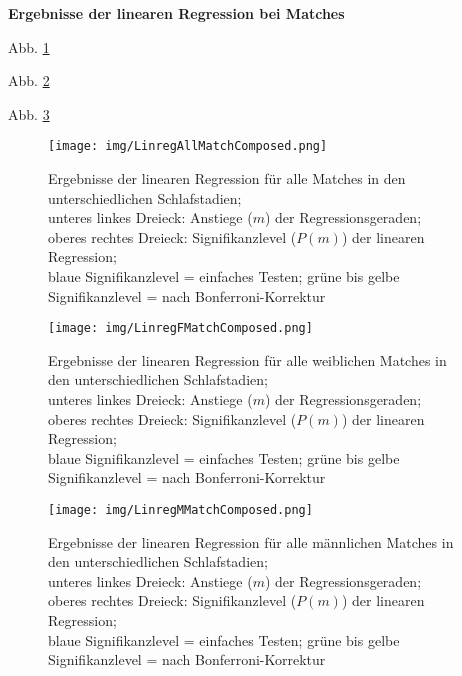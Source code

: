 \textbf{Ergebnisse der linearen Regression bei Matches}

Abb. \ref{fig:LinregAllMatchComposed}

Abb. \ref{fig:LinregFMatchComposed}

Abb. \ref{fig:LinregMMatchComposed}




\begin{figure}[H]
	\centering
	\texttt{[image: img/LinregAllMatchComposed.png]}
	\caption[Ergebnisse der linearen Regression für alle Matches]{Ergebnisse der linearen Regression für alle Matches in den unterschiedlichen Schlafstadien;\\unteres linkes Dreieck: Anstiege ($m$) der Regressionsgeraden;\\oberes rechtes Dreieck: Signifikanzlevel ($P(m)$) der linearen Regression;\\blaue Signifikanzlevel = einfaches Testen; grüne bis gelbe Signifikanzlevel = nach Bonferroni-Korrektur}
	\label{fig:LinregAllMatchComposed}
\end{figure}




\begin{figure}[H]
	\centering
	\texttt{[image: img/LinregFMatchComposed.png]}
	\caption[Ergebnisse der linearen Regression für alle weiblichen Matches]{Ergebnisse der linearen Regression für alle weiblichen Matches in den unterschiedlichen Schlafstadien;\\unteres linkes Dreieck: Anstiege ($m$) der Regressionsgeraden;\\oberes rechtes Dreieck: Signifikanzlevel ($P(m)$) der linearen Regression;\\blaue Signifikanzlevel = einfaches Testen; grüne bis gelbe Signifikanzlevel = nach Bonferroni-Korrektur}
	\label{fig:LinregFMatchComposed}
\end{figure}




\begin{figure}[H]
	\centering
	\texttt{[image: img/LinregMMatchComposed.png]}
	\caption[Ergebnisse der linearen Regression für alle männlichen Matches]{Ergebnisse der linearen Regression für alle männlichen Matches in den unterschiedlichen Schlafstadien;\\unteres linkes Dreieck: Anstiege ($m$) der Regressionsgeraden;\\oberes rechtes Dreieck: Signifikanzlevel ($P(m)$) der linearen Regression;\\blaue Signifikanzlevel = einfaches Testen; grüne bis gelbe Signifikanzlevel = nach Bonferroni-Korrektur}
	\label{fig:LinregMMatchComposed}
\end{figure}

